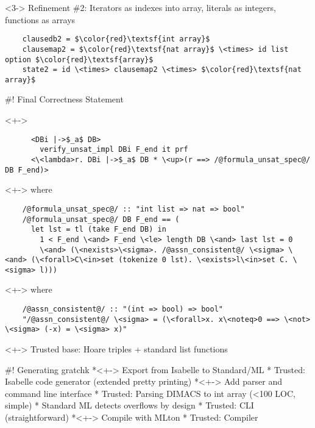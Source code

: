 \documentclass[fleqn]{beamer}
\begin{document}
  \begin{uncoverenv}<3->
  Refinement \#2: Iterators as indexes into array, literals as integers, functions as arrays
  \begin{lstlisting}
    clausedb2 = $\color{red}\textsf{int array}$
    clausemap2 = $\color{red}\textsf{nat array}$ \<times> id list option $\color{red}\textsf{array}$
    state2 = id \<times> clausemap2 \<times> $\color{red}\textsf{nat array}$
  \end{lstlisting}
  \end{uncoverenv}
    
#! Final Correctness Statement    
  \begin{uncoverenv}<+->
  \begin{lstlisting}
      <DBi |->$_a$ DB> 
        verify_unsat_impl DBi F_end it prf
      <\<lambda>r. DBi |->$_a$ DB * \<up>(r ==> /@formula_unsat_spec@/ DB F_end)>
  \end{lstlisting}
  \end{uncoverenv}

  \begin{uncoverenv}<+->
  where
  \begin{lstlisting}
    /@formula_unsat_spec@/ :: "int list => nat => bool"
    /@formula_unsat_spec@/ DB F_end == (
      let lst = tl (take F_end DB) in
        1 < F_end \<and> F_end \<le> length DB \<and> last lst = 0 
        \<and> (\<nexists>\<sigma>. /@assn_consistent@/ \<sigma> \<and> (\<forall>C\<in>set (tokenize 0 lst). \<exists>l\<in>set C. \<sigma> l)))
  \end{lstlisting}
  \end{uncoverenv}

  \begin{uncoverenv}<+->
  where
  \begin{lstlisting}
    /@assn_consistent@/ :: "(int => bool) => bool"
    "/@assn_consistent@/ \<sigma> = (\<forall>x. x\<noteq>0 ==> \<not> \<sigma> (-x) = \<sigma> x)"
  \end{lstlisting}
  \end{uncoverenv}

  \begin{uncoverenv}<+->
  Trusted base: Hoare triples + standard list functions  
  \end{uncoverenv}
    
#! Generating gratchk
  *<+-> Export from Isabelle to Standard/ML 
    * Trusted: Isabelle code generator (extended pretty printing)
  *<+-> Add parser and command line interface
    * Trusted: Parsing DIMACS to int array (<100 LOC, simple)
      * Standard ML detects overflows by design
    * Trusted: CLI (straightforward)
  *<+-> Compile with MLton
    * Trusted: Compiler
\end{document}
